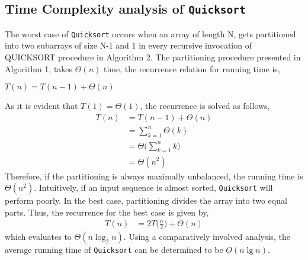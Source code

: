 \documentclass[a4paper, 10pt,twocolumn]{article} %
\begin{document}
\subsection{Time Complexity analysis of \texttt{Quicksort}}
The worst case of \texttt{Quicksort} occurs when an array of length N, gets partitioned into two subarrays of size N-1 and 1 in every recursive invocation of
QUICKSORT procedure in Algorithm 2. The partitioning procedure presented in Algorithm 1, takes $\Theta(n)$ time, the recurrence relation for running time
is,
\begin{center}
    $T(n) = T(n - 1) + \Theta(n)$
\end{center}
As it is evident that $T(1) = \Theta(1)$, the recurrence is solved as follows,
\begin{align*} %
    T(n) &= T(n - 1) + \Theta(n)\\
    &=\sum\limits_{k=1}^{n} \Theta(k)\\
    &=\Theta\bigg(\sum\limits_{k=1}^{n} k \bigg)\\
    &=\Theta(n^2)
\end{align*}
Therefore, if the partitioning is always maximally unbalanced, the running time is $\Theta(n^2)$. Intuitively, if an input sequence is almost sorted, \texttt{Quicksort} will perform poorly. In the best case, partitioning divides the array into two equal parts. Thus, the recurrence for the best case is given by,
\begin{align*}
    T(n) &= 2T\bigg(\frac{n}{2}\bigg)+ \Theta(n)
\end{align*}
which evaluates to $ \Theta(n\log_2 n)$. Using a comparatively involved analysis, the average running time of \texttt{Quicksort} can be determined to be $O(n \lg n)$.
\end{document}
